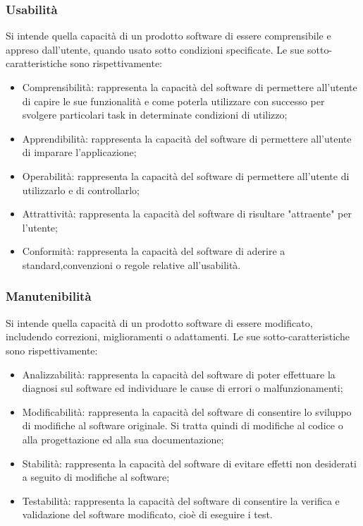 \subsubsection{Usabilità}
Si intende quella capacità di un prodotto software di essere comprensibile e appreso dall'utente, quando usato sotto condizioni specificate.
Le sue sotto-caratteristiche sono rispettivamente:
\begin{itemize}
\item Comprensibilità: rappresenta la capacità del software di permettere all'utente di capire le sue funzionalità e come poterla utilizzare con successo per svolgere particolari task in determinate condizioni di utilizzo;
\item Apprendibilità: rappresenta la capacità del software di permettere all'utente di imparare l'applicazione;
\item Operabilità: rappresenta la capacità del software di permettere all'utente di utilizzarlo e di controllarlo;
\item Attrattività: rappresenta la capacità del software di risultare "attraente" per l'utente;
\item Conformità: rappresenta la capacità del software di aderire a standard,convenzioni o regole relative all'usabilità.
\end{itemize}

\subsubsection{Manutenibilità}
Si intende quella capacità di un prodotto software di essere modificato, includendo correzioni, miglioramenti o adattamenti.
Le sue sotto-caratteristiche sono rispettivamente:
\begin{itemize}
\item Analizzabilità: rappresenta la capacità del software di poter effettuare la diagnosi sul software ed individuare le cause di errori o malfunzionamenti;
\item Modificabilità: rappresenta la capacità del software di consentire lo sviluppo di modifiche al software originale. Si tratta quindi di modifiche al codice o alla progettazione ed alla sua documentazione;
\item Stabilità: rappresenta la capacità del software di evitare effetti non desiderati a seguito di modifiche al software;
\item Testabilità: rappresenta la capacità del software di consentire la verifica e validazione del software modificato, cioè di eseguire i test.
\end{itemize}

